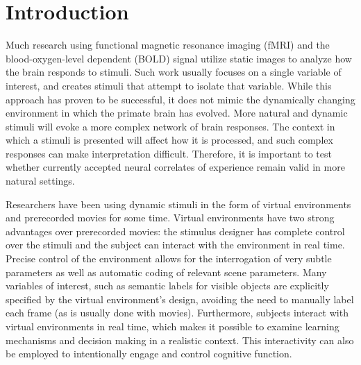 \documentclass[5p,authoryear]{elsarticle}
\begin{document}
\section{Introduction}
Much research using functional magnetic resonance imaging (fMRI) and the blood-oxygen-level dependent (BOLD) signal utilize static images to analyze how the brain responds to stimuli.
Such work usually focuses on a single variable of interest, and creates stimuli that attempt to isolate that variable.
While this approach has proven to be successful, it does not mimic the dynamically changing environment in which the primate brain has evolved.
More natural and dynamic stimuli will evoke a more complex network of brain responses.
The context in which a stimuli is presented will affect how it is processed, and such complex responses can make interpretation difficult.
Therefore, it is important to test whether currently accepted neural correlates of experience remain valid in more natural settings.

Researchers have been using dynamic stimuli in the form of virtual environments \citep{Maguire1998,Calhoun2002,King2006,Mathiak2006,Spiers2007a,Hassabis2009} and prerecorded movies \citep{Hasson2004,Chadwick2010,Nishimoto2011} for some time.
Virtual environments have two strong advantages over prerecorded movies: the stimulus designer has complete control over the stimuli and the subject can interact with the environment in real time.
Precise control of the environment allows for the interrogation of very subtle parameters as well as automatic coding of relevant scene parameters.
Many variables of interest, such as semantic labels for visible objects are explicitly specified by the virtual environment's design, avoiding the need to manually label each frame (as is usually done with movies).
Furthermore, subjects interact with virtual environments in real time, which makes it possible to examine learning mechanisms and decision making in a realistic context.
This interactivity can also be employed to intentionally engage and control cognitive function.
\end{document}
